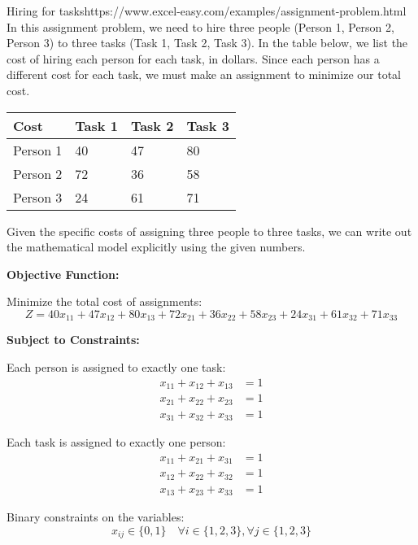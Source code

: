 \begin{examplewithallcode}{Hiring for tasks}{https://www.excel-easy.com/examples/assignment-problem.html}{}{}
In this assignment problem, we need to hire three people (Person 1, Person 2, Person 3) to three tasks (Task 1, Task 2, Task 3).   In the table below, we list the cost of hiring each person for each task, in dollars.  Since each person has a different cost for each task, we must make an assignment to minimize our total cost.
    \begin{tabular}{llll}
    \hline
        Cost & Task 1 & Task 2 & Task 3  \\ \hline
        Person 1 & 40 & 47 & 80  \\ \hline
        Person 2 & 72 & 36 & 58  \\ \hline
        Person 3 & 24 & 61 & 71 \\ \hline
    \end{tabular}

Given the specific costs of assigning three people to three tasks, we can write out the mathematical model explicitly using the given numbers.

\textbf{Objective Function:}

Minimize the total cost of assignments:
\begin{equation}
    Z = 40x_{11} + 47x_{12} + 80x_{13} + 72x_{21} + 36x_{22} + 58x_{23} + 24x_{31} + 61x_{32} + 71x_{33}
\end{equation}

\textbf{Subject to Constraints:}

Each person is assigned to exactly one task:
\begin{align}
    x_{11} + x_{12} + x_{13} &= 1 \\
    x_{21} + x_{22} + x_{23} &= 1 \\
    x_{31} + x_{32} + x_{33} &= 1
\end{align}

Each task is assigned to exactly one person:
\begin{align}
    x_{11} + x_{21} + x_{31} &= 1 \\
    x_{12} + x_{22} + x_{32} &= 1 \\
    x_{13} + x_{23} + x_{33} &= 1
\end{align}

Binary constraints on the variables:
\begin{equation}
    x_{ij} \in \{0, 1\} \quad \forall i \in \{1, 2, 3\}, \forall j \in \{1, 2, 3\}
\end{equation}


\end{examplewithallcode}
